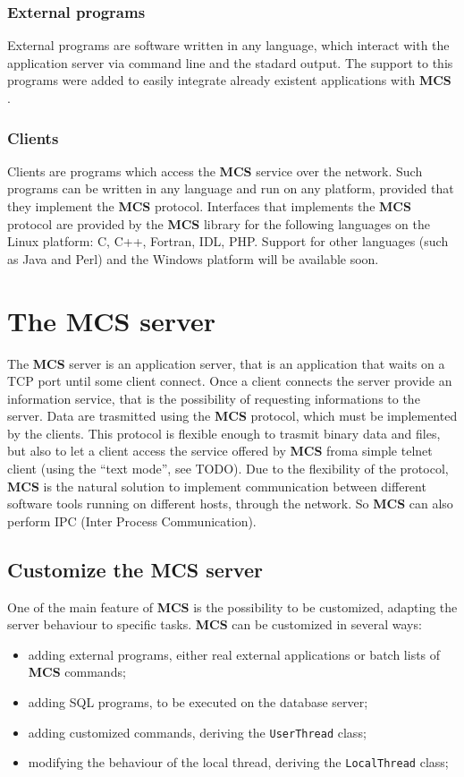 \documentclass[12pt,titlepage]{book}
\newcommand{\mcs}{\textbf{MCS} }
\begin{document}
\subsubsection{External programs}
External programs are software written in any language, which interact
with the application server via command line and the stadard output.
The support to this programs were added to easily integrate already
existent applications with \mcs.


\subsubsection{Clients}
Clients are programs which access the \mcs service over the
network. Such programs can be written in any language and run on any
platform, provided that they implement the \mcs protocol. Interfaces
that implements the \mcs protocol are provided by the \mcs library for
the following languages on the Linux platform: C, C++, Fortran, IDL,
PHP. Support for other languages (such as Java and Perl) and the
Windows platform will be available soon.


\section{The MCS server}
\label{sec:themcsserver}
The \mcs server is an application server, that is an application that
waits on a TCP port until some client connect. Once a client connects
the server provide an information service, that is the possibility of
requesting informations to the server. Data are trasmitted using the
\mcs protocol, which must be implemented by the clients. This protocol
is flexible enough to trasmit binary data and files, but also to let a
client access the service offered by \mcs froma simple telnet client
(using the ``text mode'', see TODO). Due to the flexibility of the
protocol, \mcs is the natural solution to implement communication
between different software tools running on different hosts, through
the network. So \mcs can also perform IPC (Inter Process
Communication).

\subsection{Customize the MCS server}
\label{ssec:customizemcs}
One of the main feature of \mcs is the possibility to be customized,
adapting the server behaviour to specific tasks. \mcs can be
customized in several ways:

\begin{itemize}
\item adding external programs, either real external applications or
  batch lists of \mcs commands;
\item adding SQL programs, to be executed on the database server;
\item adding customized commands, deriving the \verb|UserThread|
  class;
\item modifying the behaviour of the local thread, deriving the
  \verb|LocalThread| class;
\end{itemize}
\end{document}
